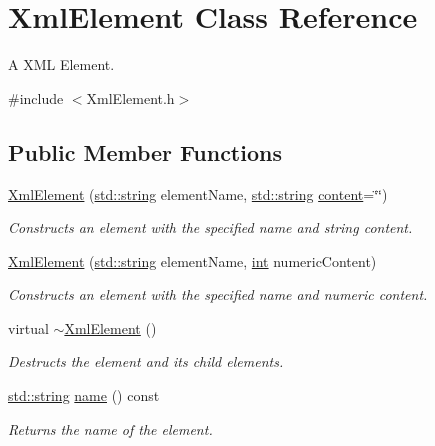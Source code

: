 \hypertarget{class_xml_element}{\section{Xml\-Element Class Reference}
\label{class_xml_element}
}


A X\-M\-L Element.  




{\ttfamily \#include $<$Xml\-Element.\-h$>$}

\subsection*{Public Member Functions}
\begin{DoxyCompactItemize}
\item 
\hyperlink{class_xml_element_a94d6c15e996994d62316b198f369d675}{Xml\-Element} (\hyperlink{glew_8h_ae84541b4f3d8e1ea24ec0f466a8c568b}{std\-::string} element\-Name, \hyperlink{glew_8h_ae84541b4f3d8e1ea24ec0f466a8c568b}{std\-::string} \hyperlink{class_xml_element_a3fea4e46ca4e63ceb905a96a8f304381}{content}=\char`\"{}\char`\"{})
\begin{DoxyCompactList}\small\item\em Constructs an element with the specified name and string content. \end{DoxyCompactList}\item 
\hyperlink{class_xml_element_a879b90d96dc87b6f7ebb9c67ba92cb73}{Xml\-Element} (\hyperlink{glew_8h_ae84541b4f3d8e1ea24ec0f466a8c568b}{std\-::string} element\-Name, \hyperlink{wglew_8h_a500a82aecba06f4550f6849b8099ca21}{int} numeric\-Content)
\begin{DoxyCompactList}\small\item\em Constructs an element with the specified name and numeric content. \end{DoxyCompactList}\item 
virtual \hyperlink{class_xml_element_ac862c3db543830858fba97c6196afd6b}{$\sim$\-Xml\-Element} ()
\begin{DoxyCompactList}\small\item\em Destructs the element and its child elements. \end{DoxyCompactList}\item 
\hyperlink{glew_8h_ae84541b4f3d8e1ea24ec0f466a8c568b}{std\-::string} \hyperlink{class_xml_element_a924c45bc90419123174ac9d11089cb6d}{name} () const 
\begin{DoxyCompactList}\small\item\em Returns the name of the element. \end{DoxyCompactList}\item 

\end{DoxyCompactItemize}
